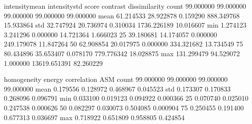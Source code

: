 \documentclass[letterpaper,10pt,english]{sphinxmanual}
\begin{document}
\begin{sphinxVerbatim}[commandchars=\\\{\}]
   
  
\PYG{p}{[}\PYG{p}{]}  \PYG{p}{[}\PYG{p}{]}
            
\end{sphinxVerbatim}

\begin{sphinxVerbatim}[commandchars=\\\{\}]
       intensity\PYGZus{}mean  intensity\PYGZus{}std      score      contrast  dissimilarity  \PYGZbs{}
count       99.000000      99.000000  99.000000     99.000000      99.000000   
mean        61.214533      28.922878   0.159290    888.349768      15.933864   
std         32.747924      20.736974   0.310034   1736.226189      10.016607   
min          1.274123       3.241296   0.000000     14.721364       1.666023   
25\PYGZpc{}         39.180681      14.174057   0.000000    249.179078      11.847264   
50\PYGZpc{}         62.908854      20.017975   0.000000    334.321682      13.734549   
75\PYGZpc{}         80.434896      35.653407   0.078170    779.776342      18.028875   
max        131.299479      94.529072   1.000000  13619.651391      82.260229   

       homogeneity     energy  correlation        ASM  
count    99.000000  99.000000    99.000000  99.000000  
mean      0.179556   0.128972     0.468967   0.045523  
std       0.173307   0.170833     0.268096   0.096791  
min       0.033100   0.019123    \PYGZhy{}0.094922   0.000366  
25\PYGZpc{}       0.070740   0.025010     0.247538   0.000626  
50\PYGZpc{}       0.082297   0.030073     0.504085   0.000904  
75\PYGZpc{}       0.250455   0.191400     0.677313   0.036697  
max       0.718922   0.651809     0.958805   0.424854  
\end{sphinxVerbatim}

\begin{sphinxVerbatim}[commandchars=\\\{\}]
   
\end{sphinxVerbatim}
\end{document}

